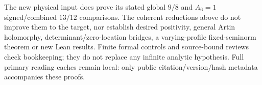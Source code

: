 The new physical input does prove its stated global $9/8$ and
$A_6=1$ signed/combined $13/12$ comparisons. The coherent reductions
above do not improve them to the target, nor establish desired
positivity, general Artin holomorphy, determinant/zero-location
bridges, a varying-profile fixed-seminorm theorem or new Lean results.
Finite formal controls and source-bound reviews check bookkeeping;
they do not replace any infinite analytic hypothesis. Full primary
reading caches remain local: only public citation/version/hash
metadata accompanies these proofs.
